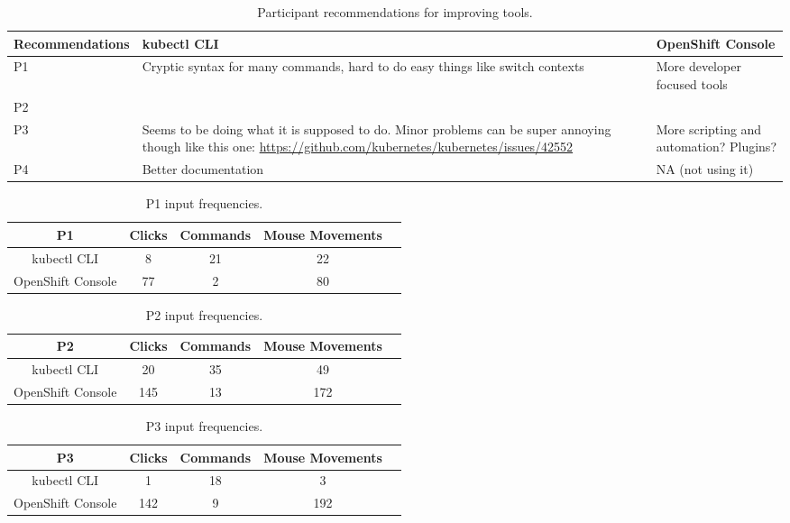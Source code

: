 \documentclass[11pt, oneside]{article}   	%
\begin{document}
\begin{table}
 \centering
  \begin{tabular}{ | m{3cm} | m{6cm} | m{6cm} | } 
  \hline
  Recommendations & kubectl CLI & OpenShift Console \\ 
  \hline
  P1 & Cryptic syntax for many commands, hard to do easy things like switch contexts & More developer focused tools \\ 
  \hline
  P2 & & \\
  \hline
  P3 & Seems to be doing what it is supposed to do. Minor problems can be super annoying though like this one: \url{https://github.com/kubernetes/kubernetes/issues/42552} & More scripting and automation? Plugins? \\
  \hline
  P4 & Better documentation & NA (not using it) \\
  \hline
  \end{tabular}
 \caption{Participant recommendations for improving tools.}
 \label{table:t10}
\end{table}

\begin{table}
 \centering
  \begin{tabular}{ | c | c | c | c | c | }
  \hline
  P1 & Clicks & Commands & Mouse Movements \\ 
  \hline
  kubectl CLI & 8 & 21 & 22 \\ 
  \hline
  OpenShift Console & 77 & 2 & 80 \\ 
  \hline
  \end{tabular}
 \caption{P1 input frequencies.}
 \label{table:t1}
\end{table}

\begin{table}
 \centering
  \begin{tabular}{ | c | c | c | c | c | } 
  \hline
  P2 & Clicks & Commands & Mouse Movements \\ 
  \hline
  kubectl CLI & 20 & 35 & 49 \\ 
  \hline
  OpenShift Console & 145 & 13 & 172 \\ 
  \hline
  \end{tabular}
 \caption{P2 input frequencies.}
 \label{table:t2}
\end{table}

\begin{table}
 \centering
  \begin{tabular}{ | c | c | c | c | c | } 
  \hline
  P3 & Clicks & Commands & Mouse Movements \\ 
  \hline
  kubectl CLI & 1 & 18 & 3 \\ 
  \hline
  OpenShift Console & 142 & 9 & 192 \\ 
  \hline
  \end{tabular}
 \caption{P3 input frequencies.}
 \label{table:t3}
\end{table}
\end{document}

